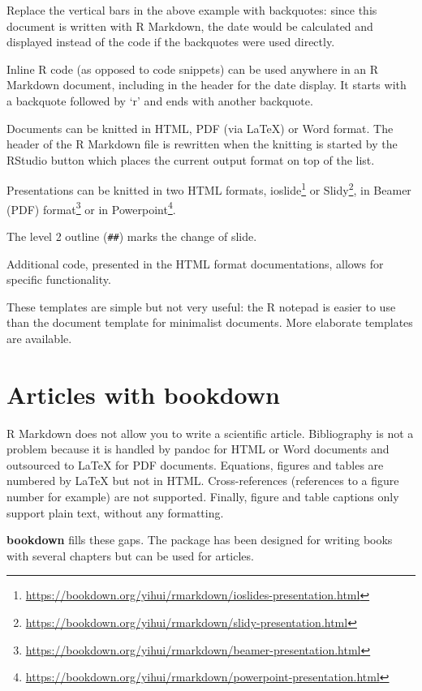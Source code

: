 \documentclass[
  12pt,
  american,
  a4paper,
  extrafontsizes,onecolumn,openright
  ]{memoir}
\begin{document}
Replace the vertical bars \texttt{\textbar{}} in the above example with backquotes: since this document is written with R Markdown, the date would be calculated and displayed instead of the code if the backquotes were used directly.

Inline R code (as opposed to code snippets) can be used anywhere in an R Markdown document, including in the header for the date display.
It starts with a backquote followed by `r' and ends with another backquote.

Documents can be knitted in HTML, PDF (via LaTeX) or Word format.
The header of the R Markdown file is rewritten when the knitting is started by the RStudio button which places the current output format on top of the list.

Presentations can be knitted in two HTML formats, ioslide\footnote{\url{https://bookdown.org/yihui/rmarkdown/ioslides-presentation.html}} or Slidy\footnote{\url{https://bookdown.org/yihui/rmarkdown/slidy-presentation.html}}, in Beamer (PDF) format\footnote{\url{https://bookdown.org/yihui/rmarkdown/beamer-presentation.html}} or in Powerpoint\footnote{\url{https://bookdown.org/yihui/rmarkdown/powerpoint-presentation.html}}.

The level 2 outline (\texttt{\#\#}) marks the change of slide.

Additional code, presented in the HTML format documentations, allows for specific functionality.

These templates are simple but not very useful: the R notepad is easier to use than the document template for minimalist documents.
More elaborate templates are available.

\section{Articles with bookdown}\label{articles-with-bookdown}

R Markdown does not allow you to write a scientific article.
Bibliography is not a problem because it is handled by pandoc for HTML or Word documents and outsourced to LaTeX for PDF documents.
Equations, figures and tables are numbered by LaTeX but not in HTML.
Cross-references (references to a figure number for example) are not supported.
Finally, figure and table captions only support plain text, without any formatting.

\textbf{bookdown} fills these gaps.
The package has been designed for writing books with several chapters but can be used for articles.
\end{document}
